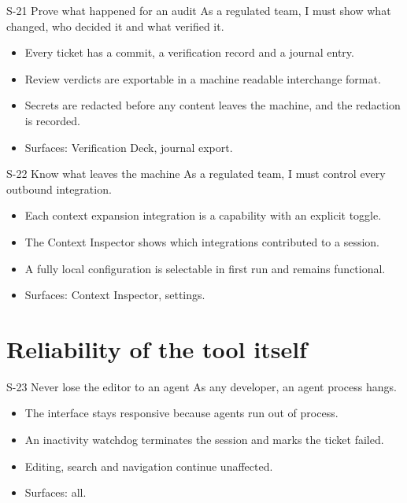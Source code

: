 \begin{story}{S-21 \quad Prove what happened for an audit}
As a regulated team, I must show what changed, who decided it and what verified it.
\end{story}
\begin{itemize}
  \item Every ticket has a commit, a verification record and a journal entry.
  \item Review verdicts are exportable in a machine readable interchange format.
  \item Secrets are redacted before any content leaves the machine, and the redaction is
  recorded.
  \item Surfaces: Verification Deck, journal export.
\end{itemize}

\begin{story}{S-22 \quad Know what leaves the machine}
As a regulated team, I must control every outbound integration.
\end{story}
\begin{itemize}
  \item Each context expansion integration is a capability with an explicit toggle.
  \item The Context Inspector shows which integrations contributed to a session.
  \item A fully local configuration is selectable in first run and remains functional.
  \item Surfaces: Context Inspector, settings.
\end{itemize}

\section{Reliability of the tool itself}

\begin{story}{S-23 \quad Never lose the editor to an agent}
As any developer, an agent process hangs.
\end{story}
\begin{itemize}
  \item The interface stays responsive because agents run out of process.
  \item An inactivity watchdog terminates the session and marks the ticket failed.
  \item Editing, search and navigation continue unaffected.
  \item Surfaces: all.
\end{itemize}

